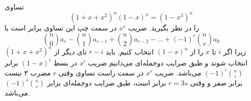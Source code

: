 \p
تساوی
$$(1 + x + x^2)^n(1 - x)^n = (1 - x^3)^n$$
 را در نظر بگیرید. ضریب $x^r$ در سمت چپ این تساوی برابر است با
$${n \choose 0}a_r - {n \choose 1}a_{r - 1} + {n \choose 2}a_{r - 2} - \dots + (-1)^r{n \choose r}a_0$$
زیرا اگر $i$ تا $x$
را از
$(1-x)^n$
انتخاب کنیم, باید $r-i$
تای دیگر از 
$(1+x+x^2)^n$
انتخاب شوند
و طبق ضرایب دوجمله‌ای می‌دانیم ضریب 
$x^i$
در بسط
$(1-x)^i$ 
برابر 
$(-1)^i {n \choose i}$
می‌باشد.
 ضریب
$x^r$ 
در سمت راست تساوی وقتی
$r$ مضرب ۳ نیست برابر صفر و وقتی
$r = 3s$ برابر
است، طبق ضرایب دوجمله‌ای برابر
$(-1)^s{n \choose s}$ می‌باشد.
